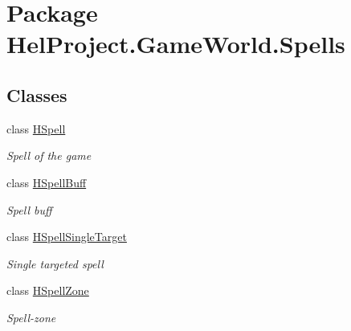 \hypertarget{namespace_hel_project_1_1_game_world_1_1_spells}{}\section{Package Hel\+Project.\+Game\+World.\+Spells}
\label{namespace_hel_project_1_1_game_world_1_1_spells}
\subsection*{Classes}
\begin{DoxyCompactItemize}
\item 
class \hyperlink{class_hel_project_1_1_game_world_1_1_spells_1_1_h_spell}{H\+Spell}
\begin{DoxyCompactList}\small\item\em Spell of the game \end{DoxyCompactList}\item 
class \hyperlink{class_hel_project_1_1_game_world_1_1_spells_1_1_h_spell_buff}{H\+Spell\+Buff}
\begin{DoxyCompactList}\small\item\em Spell buff \end{DoxyCompactList}\item 
class \hyperlink{class_hel_project_1_1_game_world_1_1_spells_1_1_h_spell_single_target}{H\+Spell\+Single\+Target}
\begin{DoxyCompactList}\small\item\em Single targeted spell \end{DoxyCompactList}\item 
class \hyperlink{class_hel_project_1_1_game_world_1_1_spells_1_1_h_spell_zone}{H\+Spell\+Zone}
\begin{DoxyCompactList}\small\item\em Spell-\/zone \end{DoxyCompactList}\end{DoxyCompactItemize}
